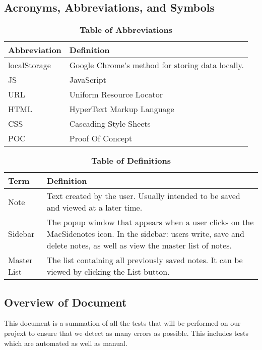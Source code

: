 \documentclass[12pt, titlepage]{article}
\begin{document}
\subsection{Acronyms, Abbreviations, and Symbols}
	
\begin{table}[hbp]
\caption{\textbf{Table of Abbreviations}} \label{Table}

\begin{tabularx}{\textwidth}{p{3cm}X}
\toprule
\textbf{Abbreviation} & \textbf{Definition} \\
\midrule
localStorage & Google Chrome's method for storing data locally.\\
JS & JavaScript\\
URL & Uniform Resource Locator\\
HTML & HyperText Markup Language\\
CSS & Cascading Style Sheets\\
POC & Proof Of Concept\\
\bottomrule
\end{tabularx}

\end{table}

\begin{table}[!htbp]
\caption{\textbf{Table of Definitions}} \label{Table}

\begin{tabularx}{\textwidth}{p{3cm}X}
\toprule
\textbf{Term} & \textbf{Definition}\\
\midrule
Note & Text created by the user. Usually intended to be saved and viewed at a  
later time.\\
Sidebar & The popup window that appears when a user clicks on the MacSidenotes 
icon. In the sidebar: users write, save and delete notes, as well as view the 
master list of notes.\\
Master List & The list containing all previously saved notes. It can be viewed 
by clicking the List button.\\
\bottomrule
\end{tabularx}

\end{table}	

\subsection{Overview of Document}

This document is a summation of all the tests that will be performed on our projext to 
ensure that we detect as many errors as possible. This includes tests which are 
automated as well as manual.
\end{document}
